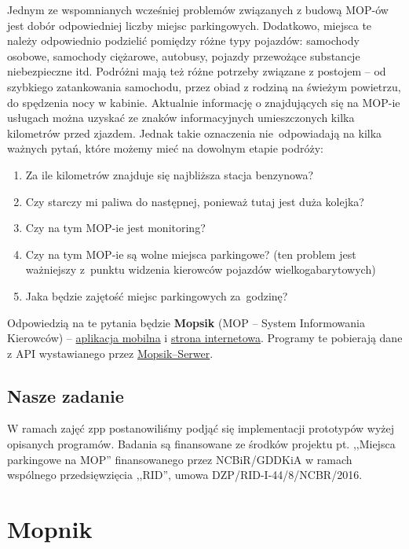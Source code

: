Jednym ze wspomnianych wcześniej problemów związanych z budową MOP-ów jest dobór odpowiedniej liczby miejsc parkingowych. Dodatkowo, miejsca te należy odpowiednio podzielić pomiędzy różne typy pojazdów: samochody osobowe, samochody ciężarowe, autobusy, pojazdy przewożące substancje niebezpieczne itd. Podróżni mają też różne potrzeby związane z postojem -- od szybkiego zatankowania samochodu, przez obiad z rodziną na świeżym powietrzu, do spędzenia nocy w kabinie. \newline Aktualnie informację o znajdujących się na MOP-ie usługach można uzyskać ze znaków informacyjnych umieszczonych kilka kilometrów przed zjazdem. Jednak takie oznaczenia nie~odpowiadają na kilka ważnych pytań, które możemy mieć na dowolnym etapie podróży:
\begin{enumerate}
	\item Za ile kilometrów znajduje się najbliższa stacja benzynowa? 
	\item Czy starczy mi paliwa do następnej, ponieważ tutaj jest duża kolejka?
	\item Czy na tym MOP-ie jest monitoring?
	\item Czy na tym MOP-ie są wolne miejsca parkingowe? (ten problem jest ważniejszy z~punktu widzenia kierowców pojazdów wielkogabarytowych)
	\item Jaka będzie zajętość miejsc parkingowych za~godzinę?
\end{enumerate}

Odpowiedzią na te pytania będzie \textbf{Mopsik} (MOP -- System Informowania Kierowców) -- \hyperref[mopsik_mobile]{aplikacja mobilna} i \hyperref[mopsik_web]{strona internetowa}. Programy te pobierają dane z API wystawianego przez \hyperref[mopsik_api]{Mopsik--Serwer}.


\section{Nasze zadanie}
W ramach zajęć \acrshort{zpp} postanowiliśmy podjąć się implementacji prototypów wyżej opisanych programów.
Badania są finansowane ze środków projektu pt. ,,Miejsca parkingowe na MOP'' finansowanego przez NCBiR/GDDKiA w ramach wspólnego przedsięwzięcia ,,RID'', umowa DZP/RID-I-44/8/NCBR/2016.
\chapter{Mopnik}\label{r:Mopnik}
\label{r:mopnik}
